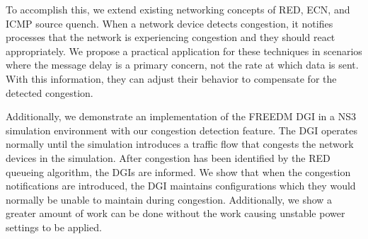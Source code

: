 To accomplish this, we extend existing networking concepts of \ac{RED}, \ac{ECN}\cite{RFCECN}, and ICMP source quench\cite{RFCSOURCEQUENCH}.
When a network device detects congestion, it notifies processes that the network is experiencing congestion and they should react appropriately.
We propose a practical application for these techniques in scenarios where the message delay is a primary concern, not the rate at which data is sent.
With this information, they can adjust their behavior to compensate for the detected congestion.

Additionally, we demonstrate an implementation of the \ac{FREEDM} \ac{DGI} in a \ac{NS3} simulation environment\cite{NS3} with our congestion detection feature.
The \ac{DGI} operates normally until the simulation introduces a traffic flow that congests the network devices in the simulation.
After congestion has been identified by the \ac{RED} queueing algorithm, the \ac{DGI}s are informed. %
We show that when the congestion notifications are introduced, the \ac{DGI} maintains configurations which they would normally be unable to maintain during congestion.
Additionally, we show a greater amount of work can be done without the work causing unstable power settings to be applied.

